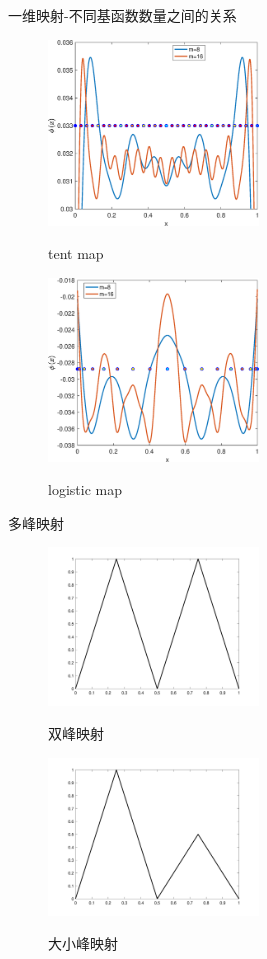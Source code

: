 \documentclass{beamer}
\begin{document}
	\begin{frame}{一维映射-不同基函数数量之间的关系}
		\begin{figure}
			\begin{minipage}{0.45\linewidth}
				\centerline{\includegraphics[width=2.2in]{images/06a-Tent_findeigen_m8m16.eps}}
				\centerline{tent map}
			\end{minipage}
			\hfill
			\begin{minipage}{0.45\linewidth}
				\centerline{\includegraphics[width=2.2in]{images/06b-Logistic_findeigen_m8m16.eps}}
				\centerline{logistic map}
			\end{minipage}
		\end{figure}
	\end{frame}
	\begin{frame}{多峰映射}
		\begin{figure}
			\begin{minipage}{0.45\linewidth}
				\centerline{\includegraphics[width=2.2in]{images/Tents5_phase_d0.png}}
				\centerline{双峰映射}
			\end{minipage}
			\hfill
			\begin{minipage}{0.45\linewidth}
				\centerline{\includegraphics[width=2.2in]{images/Tents5l_phase_d0.png}}
				\centerline{大小峰映射}
			\end{minipage}
		\end{figure}
    \end{frame}
\end{document}

